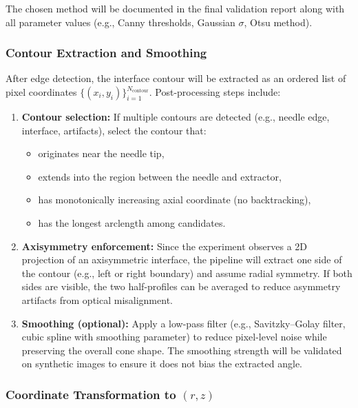 The chosen method will be documented in the final validation report along with all parameter values (e.g., Canny thresholds, Gaussian $\sigma$, Otsu method).

\subsubsection{Contour Extraction and Smoothing}

After edge detection, the interface contour will be extracted as an ordered list of pixel coordinates $\{(x_i, y_i)\}_{i=1}^{N_{\text{contour}}}$. Post-processing steps include:
\begin{enumerate}
    \item \textbf{Contour selection:} If multiple contours are detected (e.g., needle edge, interface, artifacts), select the contour that:
    \begin{itemize}
        \item originates near the needle tip,
        \item extends into the region between the needle and extractor,
        \item has monotonically increasing axial coordinate (no backtracking),
        \item has the longest arclength among candidates.
    \end{itemize}
    \item \textbf{Axisymmetry enforcement:} Since the experiment observes a 2D projection of an axisymmetric interface, the pipeline will extract one side of the contour (e.g., left or right boundary) and assume radial symmetry. If both sides are visible, the two half-profiles can be averaged to reduce asymmetry artifacts from optical misalignment.
    \item \textbf{Smoothing (optional):} Apply a low-pass filter (e.g., Savitzky--Golay filter, cubic spline with smoothing parameter) to reduce pixel-level noise while preserving the overall cone shape. The smoothing strength will be validated on synthetic images to ensure it does not bias the extracted angle.
\end{enumerate}

\subsubsection{Coordinate Transformation to $(r, z)$}

